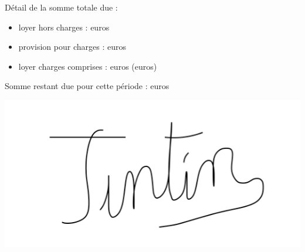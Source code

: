 \documentclass[12pt,a4paper]{article}
\begin{document}
\begin{flushleft}
Détail de la somme totale due :\\
\begin{itemize}
\item loyer hors charges : \loyerchiffres\space euros\\
\item provision pour charges : \charges\space euros\\
\item loyer charges comprises : \loyerccchiffres\space euros (\loyercclettres\space euros)\\
\end{itemize}

\medskip

Somme restant due pour cette période : \montantimpayechiffres\space euros\\
\end{flushleft}

\medskip

\begin{center}
\includegraphics[width=0.3\linewidth]{Signature.PNG}
\end{center}
\end{document}
